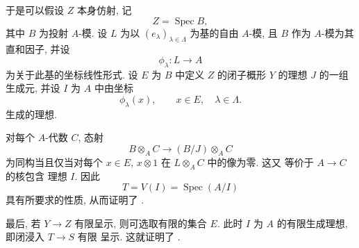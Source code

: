 于是可以假设 \(Z\) 本身仿射, 记
\[
  Z=\operatorname{Spec}B,
\]
其中 \(B\) 为投射 \(A\)-模. 设 \(L\) 为以
\((e_\lambda)_{\lambda\in\Lambda}\) 为基的自由 \(A\)-模,
且 \(B\) 作为 \(A\)-模为其直和因子, 并设
\[
  \phi_\lambda:L\longrightarrow A
\]
为关于此基的坐标线性形式. 设 \(E\)
为 \(B\) 中定义 \(Z\) 的闭子概形 \(Y\) 的理想 \(J\)
的一组生成元, 并设 \(I\) 为 \(A\) 中由坐标
\[
  \phi_\lambda(x),
  \qquad x\in E,\quad \lambda\in\Lambda.
\]
生成的理想.

对每个 \(A\)-代数 \(C\), 态射
\[
  B\otimes_A C\longrightarrow(B/J)\otimes_A C
\]
为同构当且仅当对每个 \(x\in E\), \(x\otimes1\) 在
\(L\otimes_A C\) 中的像为零. 这又
等价于 \(A\to C\) 的核包含
理想 \(I\). 因此
\[
  T=V(I)=\operatorname{Spec}(A/I)
\]
具有所要求的性质, 从而证明了 \textup{}.

最后, 若 \(Y\to Z\) 有限呈示, 则可选取有限的集合 \(E\).
此时 \(I\) 为 \(A\) 的有限生成理想,
即闭浸入 \(T\to S\) 有限
呈示. 这就证明了 \textup{}.


